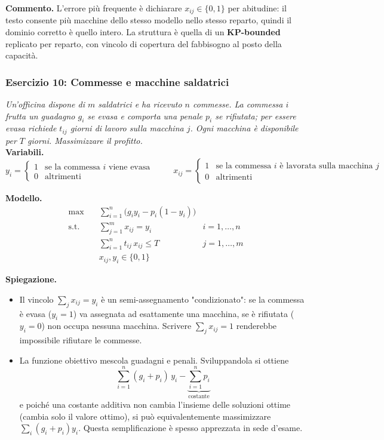 \documentclass[12pt]{extarticle} %
\begin{document}
\noindent\textbf{Commento.} L'errore più frequente è dichiarare $x_{ij} \in \{0,1\}$ per abitudine: il testo consente più macchine dello stesso modello nello stesso reparto, quindi il dominio corretto è quello intero. La struttura è quella di un \textbf{KP-bounded} replicato per reparto, con vincolo di copertura del fabbisogno al posto della capacità.

\subsubsection{Esercizio 10: Commesse e macchine saldatrici}
\textit{Un'officina dispone di $m$ saldatrici e ha ricevuto $n$ commesse. La commessa $i$ frutta un guadagno $g_i$ se evasa e comporta una penale $p_i$ se rifiutata; per essere evasa richiede $t_{ij}$ giorni di lavoro sulla macchina $j$. Ogni macchina è disponibile per $T$ giorni. Massimizzare il profitto.}\\

\noindent\textbf{Variabili.}
\[
y_i = \begin{cases} 1 & \text{se la commessa } i \text{ viene evasa}\\ 0 & \text{altrimenti}\end{cases}
\hspace{1cm}
x_{ij} = \begin{cases} 1 & \text{se la commessa } i \text{ è lavorata sulla macchina } j\\ 0 & \text{altrimenti}\end{cases}
\]

\noindent\textbf{Modello.}
\[
\begin{aligned}
\max \quad & \sum_{i=1}^n \Big( g_i y_i - p_i (1-y_i) \Big) \\
\text{s.t.} \quad & \sum_{j=1}^m x_{ij} = y_i & i=1,\dots,n \\
& \sum_{i=1}^n t_{ij}\, x_{ij} \le T & j=1,\dots,m \\
& x_{ij}, y_i \in \{0,1\}
\end{aligned}
\]

\noindent\textbf{Spiegazione.}
\begin{itemize}
    \item Il vincolo $\sum_j x_{ij} = y_i$ è un semi-assegnamento "condizionato": se la commessa è evasa ($y_i=1$) va assegnata ad esattamente una macchina, se è rifiutata ($y_i=0$) non occupa nessuna macchina. Scrivere $\sum_j x_{ij}=1$ renderebbe impossibile rifiutare le commesse.
    \item La funzione obiettivo mescola guadagni e penali. Sviluppandola si ottiene
    \[
    \sum_{i=1}^n (g_i + p_i)\, y_i - \underbrace{\sum_{i=1}^n p_i}_{\text{costante}}
    \]
    e poiché una costante additiva non cambia l'insieme delle soluzioni ottime (cambia solo il valore ottimo), si può equivalentemente massimizzare $\sum_i (g_i+p_i)y_i$. Questa semplificazione è spesso apprezzata in sede d'esame.
\end{itemize}
\end{document}
